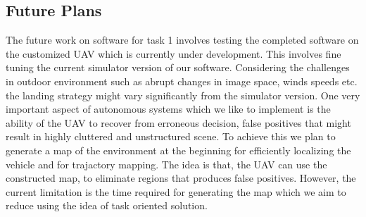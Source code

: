 \documentclass{standalone}
\begin{document}
\subsection{Future Plans}
The future work on software for task 1 involves testing the completed software on the customized UAV which is currently under development. This involves fine tuning the current simulator version of our software. Considering the challenges in outdoor environment such as abrupt changes in image space, winds speeds etc. the landing strategy might vary significantly from the simulator version. One very important aspect of autonomous systems which we like to implement is the ability of the UAV to recover from erroneous decision, false positives that might result in highly cluttered and unstructured scene. To achieve this we plan to generate a map of the environment at the beginning for efficiently localizing the vehicle and for trajactory mapping. The idea is that, the UAV can use the constructed map, to eliminate regions that produces false positives. However, the current limitation is the time required for generating the map which we aim to reduce using the idea of task oriented solution.



\end{document}
